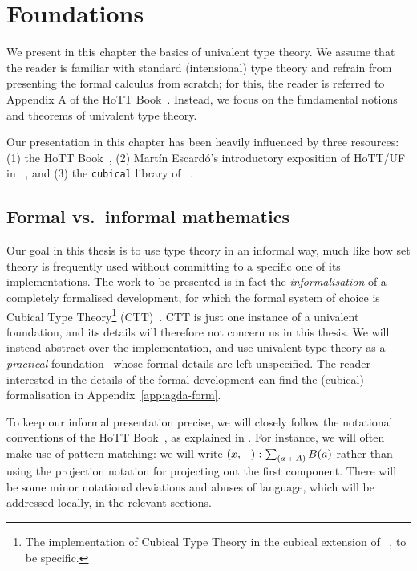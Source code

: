 \chapter{Foundations}\label{chap:foundations}

We present in this chapter the basics of univalent type theory. We assume that the reader
is familiar with standard (intensional) type theory and refrain from presenting the formal
calculus from scratch; for this, the reader is referred to Appendix A of the HoTT
Book~\cite{hottbook}. Instead, we focus on the fundamental notions and theorems of
univalent type theory.

Our presentation in this chapter has been heavily influenced by three resources: (1) the
HoTT Book~\cite{hottbook}, (2) Martín Escardó's introductory exposition of HoTT/UF in
\veragda{}~\cite{escardo-uf-intro}, and (3) the \texttt{cubical} library of
\veragda{}~\cite{agda-cubical}.

\section{Formal vs.~informal mathematics}

Our goal in this thesis is to use type theory in an informal way, much like how set theory
is frequently used without committing to a specific one of its implementations. The work
to be presented is in fact the \emph{informalisation} of a completely formalised
development, for which the formal system of choice is Cubical Type Theory\footnote{%
  The implementation of Cubical Type Theory in the cubical extension of
  \veragda{}~\cite{cubical-agda}, to be specific.
}
(CTT)~\cite{CCHM}. CTT is just one instance of a univalent foundation, and its details
will therefore not concern us in this thesis. We will instead abstract over the
implementation, and use univalent type theory as a \emph{practical}
foundation~\cite{PFOM, PFPL} whose formal details are left unspecified. The reader
interested in the details of the formal development can find the (cubical) \veragda{}
formalisation in Appendix~\ref{app:agda-form}.

To keep our informal presentation precise, we will closely follow the notational
conventions of the HoTT Book~\cite{hottbook}, as explained in
\cite[Sec.~I.1]{hottbook}. For instance, we will often make use of pattern matching: we
will write $(x, \_)\hspace{0.1mm}:\hspace{0.1mm}\sum_{(a~:~A)} B(a)$ rather than using the projection
notation for projecting out the first component. There will be some minor notational
deviations and abuses of language, which will be addressed locally, in the relevant
sections.

